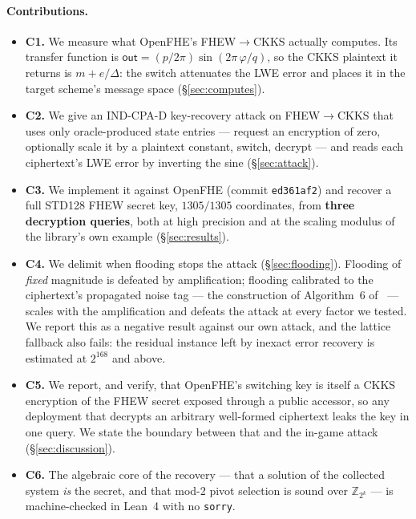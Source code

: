 \documentclass[11pt]{article}
\newcommand{\fto}{\texorpdfstring{FHEW$\to$CKKS}{FHEW-to-CKKS}}
\newcommand{\Z}{\mathbb{Z}}
\newcommand{\out}{\mathsf{out}}
\newcommand{\code}[1]{\texttt{#1}}
\begin{document}
\paragraph{Contributions.}
\begin{itemize}
  \item \textbf{C1.} We measure what OpenFHE's \fto{} actually computes. Its transfer function is
    $\out = (p/2\pi)\sin(2\pi\,\varphi/q)$, so the CKKS plaintext it returns is $m + e/\Delta$: the
    switch attenuates the LWE error and places it in the target scheme's message space
    (\S\ref{sec:computes}).
  \item \textbf{C2.} We give an IND-CPA-D key-recovery attack on \fto{} that uses only
    oracle-produced state entries --- request an encryption of zero, optionally scale it by a
    plaintext constant, switch, decrypt --- and reads each ciphertext's LWE error by inverting the
    sine (\S\ref{sec:attack}).
  \item \textbf{C3.} We implement it against OpenFHE (commit \code{ed361af2}) and recover a full
    STD128 FHEW secret key, $1305/1305$ coordinates, from \textbf{three decryption queries}, both
    at high precision and at the scaling modulus of the library's own example (\S\ref{sec:results}).
  \item \textbf{C4.} We delimit when flooding stops the attack (\S\ref{sec:flooding}). Flooding of
    \emph{fixed} magnitude is defeated by amplification; flooding calibrated to the ciphertext's
    propagated noise tag --- the construction of Algorithm~6 of~\cite{santato2026} --- scales with
    the amplification and defeats the attack at every factor we tested. We report this as a
    negative result against our own attack, and the lattice fallback also fails: the residual
    instance left by inexact error recovery is estimated at $2^{168}$ and above.
  \item \textbf{C5.} We report, and verify, that OpenFHE's switching key is itself a CKKS
    encryption of the FHEW secret exposed through a public accessor, so any deployment that
    decrypts an arbitrary well-formed ciphertext leaks the key in one query. We state the boundary
    between that and the in-game attack (\S\ref{sec:discussion}).
  \item \textbf{C6.} The algebraic core of the recovery --- that a solution of the collected
    system \emph{is} the secret, and that mod-2 pivot selection is sound over $\Z_{2^k}$ --- is
    machine-checked in Lean~4 with no \code{sorry}.
\end{itemize}
\end{document}
